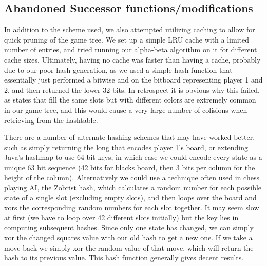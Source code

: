 \documentclass{article}
\begin{document}
\subsection{Abandoned Successor functions/modifications}
In addition to the scheme used, we also attempted utilizing caching to allow for quick pruning of the game tree. We set up a simple LRU cache with a limited number of entries, and tried running our alpha-beta algorithm on it for different cache sizes. Ultimately, having no cache was faster than having a cache, probably due to our poor hash generation, as we used a simple hash function that essentially just performed a bitwise and on the bitboard representing player 1 and 2, and then returned the lower 32 bits. In retrospect it is obvious why this failed, as states that fill the same slots but with different colors are extremely common in our game tree, and this would cause a very large number of colisions when retrieving from the hashtable.

There are a number of alternate hashing schemes that may have worked better, such as simply returning the long that encodes player 1's board, or extending Java's hashmap to use 64 bit keys, in which case we could encode every state as a unique 63 bit sequence (42 bits for blacks board, then 3 bits per column for the height of the column). Alternatively we could use a technique often used in chess playing AI, the Zobrist hash, which calculates a random number for each possible state of a single slot (excluding empty slots), and then loops over the board and xors the corresponding random numbers for each slot together. It may seem slow at first (we have to loop over 42 different slots initially) but the key lies in computing subsequent hashes. Since only one state has changed, we can simply xor the changed squares value with our old hash to get a new one. If we take a move back we simply xor the random value of that move, which will return the hash to its previous value. This hash function generally gives decent results.
\end{document}
